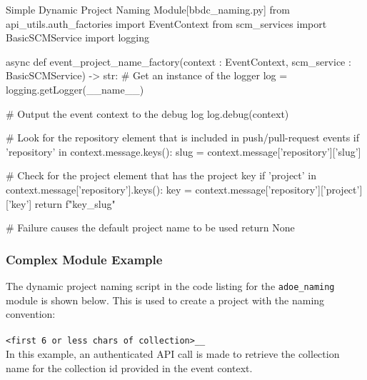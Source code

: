 \begin{code}{Simple Dynamic Project Naming Module}{[bbdc\_naming.py]}{}
from api_utils.auth_factories import EventContext
from scm_services import BasicSCMService
import logging

async def event_project_name_factory(context : EventContext, scm_service : BasicSCMService) -> str:
  # Get an instance of the logger
  log = logging.getLogger(__name__)

  # Output the event context to the debug log
  log.debug(context)


  # Look for the repository element that is included in push/pull-request events
  if 'repository' in context.message.keys():
    slug = context.message['repository']['slug']

    # Check for the project element that has the project key
    if 'project' in context.message['repository'].keys():
      key = context.message['repository']['project']['key']
      return f"{key}_{slug}"

  # Failure causes the default project name to be used
  return None
\end{code}

\subsubsection{Complex Module Example}

The dynamic project naming script in the code listing for the \texttt{adoe\_naming}
module is shown below.  This is used to create a project with the naming convention:\\\\
\texttt{<first 6 or less chars of collection>\_<project name>\_<repo name>}\\

In this example, an authenticated API call is made to retrieve the collection name
for the collection id provided in the event context.

